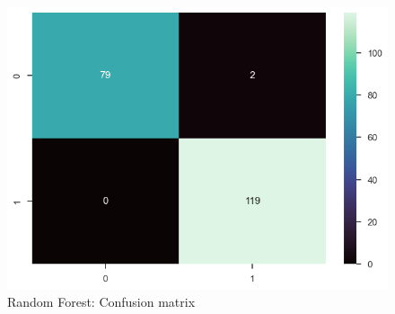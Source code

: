 \begin{figure}[H]
    \caption{Random Forest: Confusion matrix}\label{confusion-matrix-random-forest}
    \centering
    \includegraphics[width=\linewidth]{media/prediction-03-forest.png}
\end{figure}